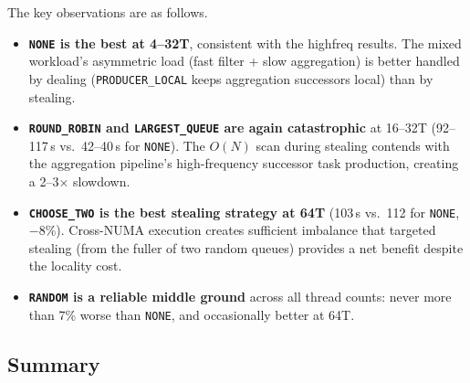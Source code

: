The key observations are as follows.
%
\begin{itemize}
    \item \textbf{\texttt{NONE} is the best at 4--32T}, consistent with the highfreq results.
    The mixed workload's asymmetric load (fast filter + slow aggregation) is better handled by dealing (\texttt{PRODUCER\_LOCAL} keeps aggregation successors local) than by stealing.

    \item \textbf{\texttt{ROUND\_ROBIN} and \texttt{LARGEST\_QUEUE} are again catastrophic} at 16--32T (92--117\,s vs.\ 42--40\,s for \texttt{NONE}).
    The $O(N)$ scan during stealing contends with the aggregation pipeline's high-frequency successor task production, creating a 2--3$\times$ slowdown.

    \item \textbf{\texttt{CHOOSE\_TWO} is the best stealing strategy at 64T} (103\,s vs.\ 112 for \texttt{NONE}, $-$8\%).
    Cross-NUMA execution creates sufficient imbalance that targeted stealing (from the fuller of two random queues) provides a net benefit despite the locality cost.

    \item \textbf{\texttt{RANDOM} is a reliable middle ground} across all thread counts: never more than 7\% worse than \texttt{NONE}, and occasionally better at 64T.
\end{itemize}

\subsection{Summary}

